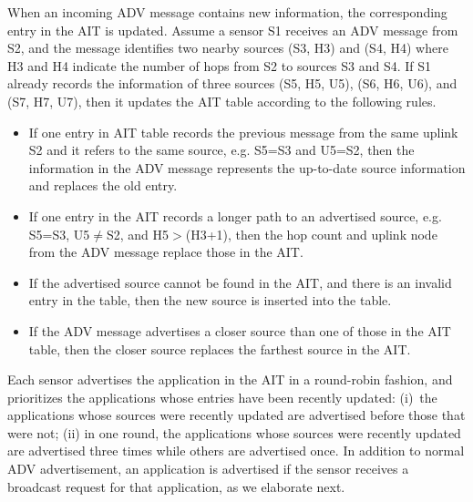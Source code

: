 When an incoming ADV message contains new information, the corresponding entry in the AIT is updated. Assume a sensor 
S1 receives an ADV message from S2, and the message identifies two nearby sources (S3, H3) and (S4, H4) where H3 and H4 
indicate the number of hops from S2 to sources S3 and S4. If S1 already records the information of three sources (S5, 
H5, U5), (S6, H6, U6), and (S7, H7, U7), then it updates the AIT table according to the following rules. 

\begin{itemize}
\item
If one entry in AIT table records the previous message from the same uplink S2 and it refers to the same source, e.g. 
S5=S3 and U5=S2, then the information in the ADV message represents the up-to-date source information and replaces the 
old entry.

\item
If one entry in the AIT records a longer path to an advertised source, e.g. S5=S3, U5$\ne$S2, and H5$>$(H3+1), then the 
hop count and uplink node from the ADV message replace those in the AIT.

\item
If the advertised source cannot be found in the AIT, and there is an invalid entry in the table, then the new source is 
inserted into the table.

\item
If the ADV message advertises a closer source than one of those in the AIT table, then the closer source replaces the 
farthest source in the AIT. 

\end{itemize}

Each sensor advertises the application in the AIT in a round-robin fashion, and prioritizes the applications whose 
entries have been recently updated: (i)~the applications whose sources were recently updated are advertised before 
those that were not; (ii) in one round, the applications whose sources were recently updated are advertised three times 
while others are advertised once. In addition to normal ADV advertisement, an application is advertised if the sensor 
receives a broadcast request for that application, as we elaborate next.

